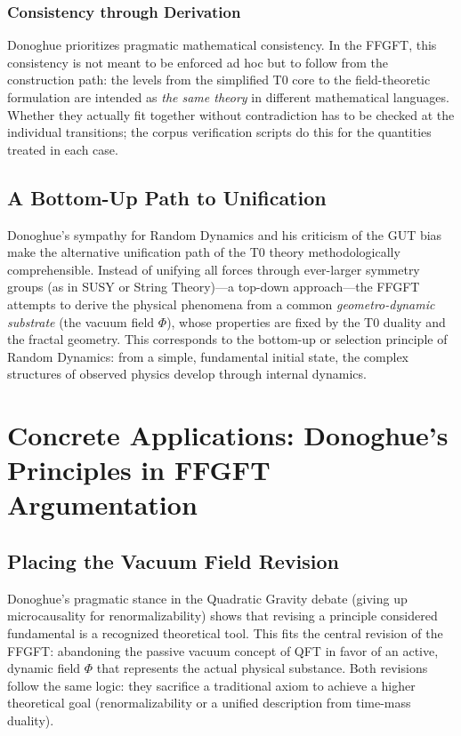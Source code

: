 	\subsubsection{Consistency through Derivation}
	Donoghue prioritizes pragmatic mathematical consistency. In the FFGFT, this consistency is not meant to be enforced ad hoc but to follow from the construction path: the levels from the simplified T0 core to the field-theoretic formulation are intended as \emph{the same theory} in different mathematical languages. Whether they actually fit together without contradiction has to be checked at the individual transitions; the corpus verification scripts do this for the quantities treated in each case.
	
	\subsection{A Bottom-Up Path to Unification}
	
	Donoghue's sympathy for Random Dynamics and his criticism of the GUT bias make the alternative unification path of the T0 theory methodologically comprehensible. Instead of unifying all forces through ever-larger symmetry groups (as in SUSY or String Theory)—a top-down approach—the FFGFT attempts to derive the physical phenomena from a common \emph{geometro-dynamic substrate} (the vacuum field $\Phi$), whose properties are fixed by the T0 duality and the fractal geometry. This corresponds to the bottom-up or selection principle of Random Dynamics: from a simple, fundamental initial state, the complex structures of observed physics develop through internal dynamics.
	
	\section{Concrete Applications: Donoghue's Principles in FFGFT Argumentation}
	
	\subsection{Placing the Vacuum Field Revision}
	Donoghue's pragmatic stance in the Quadratic Gravity debate (giving up microcausality for renormalizability) shows that revising a principle considered fundamental is a recognized theoretical tool. This fits the central revision of the FFGFT: abandoning the passive vacuum concept of QFT in favor of an active, dynamic field $\Phi$ that represents the actual physical substance. Both revisions follow the same logic: they sacrifice a traditional axiom to achieve a higher theoretical goal (renormalizability or a unified description from time-mass duality).
	
